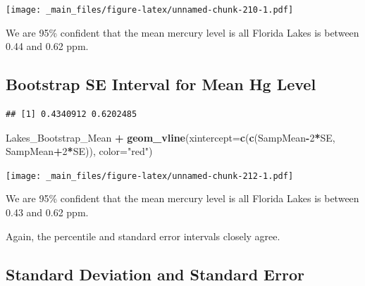 \documentclass[]{book}
\newenvironment{Shaded}{\begin{snugshade}}{\end{snugshade}}
\newcommand{\KeywordTok}[1]{\textcolor[rgb]{0.13,0.29,0.53}{\textbf{#1}}}
\newcommand{\DataTypeTok}[1]{\textcolor[rgb]{0.13,0.29,0.53}{#1}}
\newcommand{\DecValTok}[1]{\textcolor[rgb]{0.00,0.00,0.81}{#1}}
\newcommand{\StringTok}[1]{\textcolor[rgb]{0.31,0.60,0.02}{#1}}
\newcommand{\OperatorTok}[1]{\textcolor[rgb]{0.81,0.36,0.00}{\textbf{#1}}}
\newcommand{\NormalTok}[1]{#1}
\begin{document}
\texttt{[image: \_main\_files/figure-latex/unnamed-chunk-210-1.pdf]}

We are 95\% confident that the mean mercury level is all Florida Lakes
is between 0.44 and 0.62 ppm.

\subsection{Bootstrap SE Interval for Mean Hg
Level}\label{bootstrap-se-interval-for-mean-hg-level}

\begin{Shaded}
\end{Shaded}

\begin{verbatim}
## [1] 0.4340912 0.6202485
\end{verbatim}

\begin{Shaded}
\begin{Highlighting}[]
\NormalTok{Lakes_Bootstrap_Mean  }\OperatorTok{+}\StringTok{ }\KeywordTok{geom_vline}\NormalTok{(}\DataTypeTok{xintercept=}\KeywordTok{c}\NormalTok{(}\KeywordTok{c}\NormalTok{(SampMean}\OperatorTok{-}\DecValTok{2}\OperatorTok{*}\NormalTok{SE, SampMean}\OperatorTok{+}\DecValTok{2}\OperatorTok{*}\NormalTok{SE)), }\DataTypeTok{color=}\StringTok{"red"}\NormalTok{) }
\end{Highlighting}
\end{Shaded}

\texttt{[image: \_main\_files/figure-latex/unnamed-chunk-212-1.pdf]}

We are 95\% confident that the mean mercury level is all Florida Lakes
is between 0.43 and 0.62 ppm.

Again, the percentile and standard error intervals closely agree.

\subsection{Standard Deviation and Standard
Error}\label{standard-deviation-and-standard-error}
\end{document}
